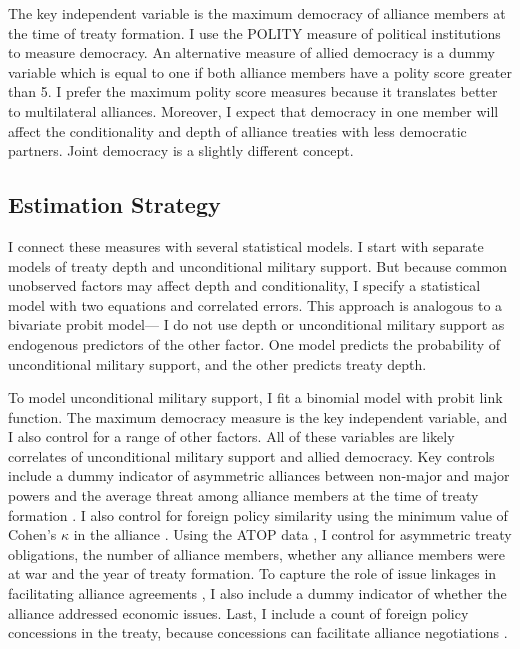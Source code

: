 \documentclass[12pt]{article}
\begin{document}
The key independent variable is the maximum democracy of alliance members at the time of treaty formation. 
I use the POLITY measure of political institutions to measure democracy.
An alternative measure of allied democracy is a dummy variable which is equal to one if both alliance members have a polity score greater than 5. 
I prefer the maximum polity score measures because it translates better to multilateral alliances. 
Moreover, I expect that democracy in one member will affect the conditionality and depth of alliance treaties with less democratic partners.
Joint democracy is a slightly different concept. 



\subsection{Estimation Strategy}

I connect these measures with several statistical models. 
I start with separate models of treaty depth and unconditional military support. 
But because common unobserved factors may affect depth and conditionality, I specify a statistical model with two equations and correlated errors.
This approach is analogous to a bivariate probit model--- I do not use depth or unconditional military support as endogenous predictors of the other factor. 
One model predicts the probability of unconditional military support, and the other predicts treaty depth.


To model unconditional military support, I fit a binomial model with probit link function. 
The maximum democracy measure is the key independent variable, and I also control for a range of other factors.
All of these variables are likely correlates of unconditional military support and allied democracy. 
Key controls include a dummy indicator of asymmetric alliances between non-major and major powers \citep{Mattes2012} and the average threat among alliance members at the time of treaty formation \citep{LeedsSavun2007}. 
I also control for foreign policy similarity \citep{Benson2012} using the minimum value of Cohen's $\kappa$ in the alliance \citep{Hage2011}.
Using the ATOP data \citep{Leedsetal2002}, I control for asymmetric treaty obligations, the number of alliance members, whether any alliance members were at war and the year of treaty formation. 
To capture the role of issue linkages in facilitating alliance agreements \citep{Poast2012, Poast2013}, I also include a dummy indicator of whether the alliance addressed economic issues.  
Last, I include a count of foreign policy concessions in the treaty, because concessions can facilitate alliance negotiations \citep{Johnson2015}. 
\end{document}
